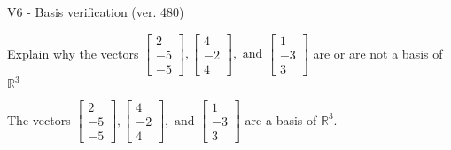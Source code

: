 \begin{exercise}
  \begin{exerciseTitle}V6 - Basis verification (ver. 480)\end{exerciseTitle}
  \begin{exerciseStatement}
    Explain why the vectors \(\left[\begin{array}{r}
2 \\
-5 \\
-5
\end{array}\right] , \left[\begin{array}{r}
4 \\
-2 \\
4
\end{array}\right] , \text{ and } \left[\begin{array}{r}
1 \\
-3 \\
3
\end{array}\right]\) are or are not a basis of \(\mathbb{R}^3\)	


  \end{exerciseStatement}
  \begin{exerciseAnswer}
   The vectors \(\left[\begin{array}{r}
2 \\
-5 \\
-5
\end{array}\right] , \left[\begin{array}{r}
4 \\
-2 \\
4
\end{array}\right] , \text{ and } \left[\begin{array}{r}
1 \\
-3 \\
3
\end{array}\right]\) 
  	 are  a basis of \(\mathbb{R}^3\).
  


  \end{exerciseAnswer}
\end{exercise}